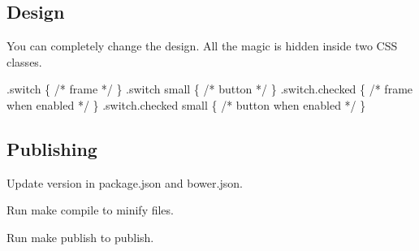 \subsection*{Design}

You can completely change the design. All the magic is hidden inside two C\+SS classes.


\begin{DoxyCode}
.switch \{
  /* frame */
\}
.switch small \{
  /* button */
\}
.switch.checked \{
  /* frame when enabled */
\}
.switch.checked small \{
  /* button when enabled */
\}
\end{DoxyCode}


\subsection*{Publishing}


\begin{DoxyEnumerate}
\item Update version in {\ttfamily package.\+json} and {\ttfamily bower.\+json}.
\item Run {\ttfamily make compile} to minify files.
\item Run {\ttfamily make publish} to publish. 
\end{DoxyEnumerate}